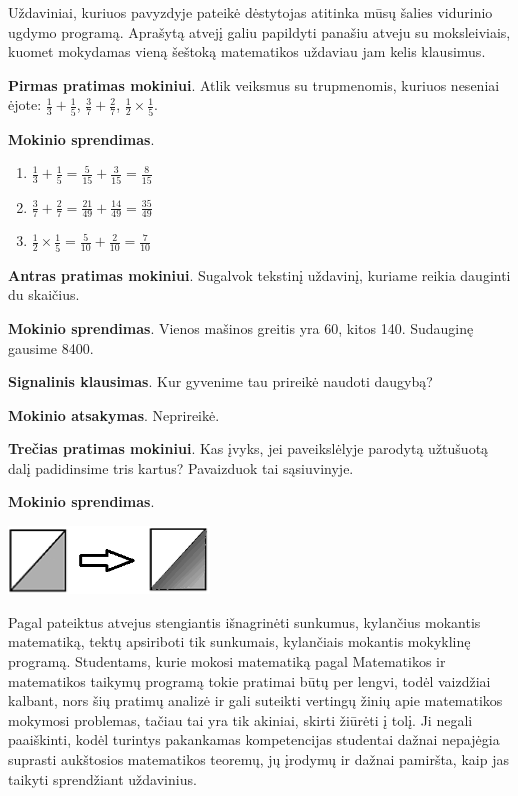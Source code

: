 \documentclass{article}
\begin{document}
Uždaviniai, kuriuos pavyzdyje pateikė dėstytojas atitinka mūsų šalies vidurinio ugdymo programą. Aprašytą atvejį galiu papildyti panašiu atveju su moksleiviais, kuomet mokydamas vieną šeštoką matematikos uždaviau jam kelis klausimus.

\begin{framed}
\textbf{Pirmas pratimas mokiniui}. Atlik veiksmus su trupmenomis, kuriuos neseniai ėjote: $\frac{1}{3}+\frac{1}{5}$, $\frac{3}{7}+\frac{2}{7}$, $\frac{1}{2}\times \frac{1}{5}$.

\textbf{Mokinio sprendimas}.

\begin{enumerate}
\item $\frac{1}{3}+\frac{1}{5}=\frac{5}{15}+\frac{3}{15}=\frac{8}{15}$
\item $\frac{3}{7}+\frac{2}{7}=\frac{21}{49}+\frac{14}{49}=\frac{35}{49}$
\item $\frac{1}{2}\times \frac{1}{5}=\frac{5}{10}+ \frac{2}{10}=\frac{7}{10}$
\end{enumerate}

\textbf{Antras pratimas mokiniui}. Sugalvok tekstinį uždavinį, kuriame reikia dauginti du skaičius.

\textbf{Mokinio sprendimas}. Vienos mašinos greitis yra 60, kitos 140. Sudauginę gausime 8400.

\textbf{Signalinis klausimas}. Kur gyvenime tau prireikė naudoti daugybą?

\textbf{Mokinio atsakymas}. Neprireikė.

\textbf{Trečias pratimas mokiniui}. Kas įvyks, jei paveikslėlyje parodytą užtušuotą dalį padidinsime tris kartus? Pavaizduok tai sąsiuvinyje.

\textbf{Mokinio sprendimas}.

\includegraphics[width=0.4\textwidth]{density.png}
\end{framed}

Pagal pateiktus atvejus stengiantis išnagrinėti sunkumus, kylančius mokantis matematiką, tektų apsiriboti tik sunkumais, kylančiais mokantis mokyklinę programą. Studentams, kurie mokosi matematiką pagal Matematikos ir matematikos taikymų programą tokie pratimai būtų per lengvi, todėl vaizdžiai kalbant, nors šių pratimų analizė ir gali suteikti vertingų žinių apie matematikos mokymosi problemas, tačiau tai yra tik akiniai, skirti žiūrėti į tolį. Ji negali paaiškinti, kodėl turintys pakankamas kompetencijas studentai dažnai nepajėgia suprasti aukštosios matematikos teoremų, jų įrodymų ir dažnai pamiršta, kaip jas taikyti sprendžiant uždavinius.
\end{document}
